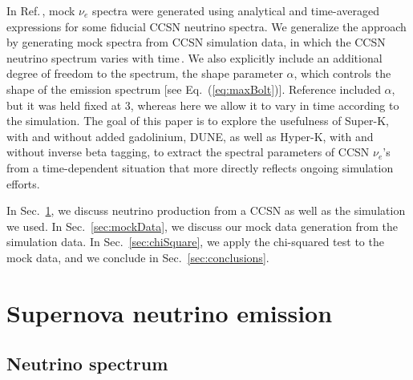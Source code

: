 \documentclass[aps,reprint,superscriptaddress]{revtex4-1}
\begin{document}
In Ref.\,\cite{Laha:2013hva}, mock $\nu_e$ spectra were generated using analytical and time-averaged expressions for some fiducial CCSN neutrino spectra.  We generalize the approach by generating mock spectra from CCSN simulation data, in which the CCSN neutrino spectrum varies with time\,\cite{Nakamura:2014caa,Nakamura:2016kkl}.  We also explicitly include an additional degree of freedom to the spectrum, the shape parameter $\alpha$, which controls the shape of the emission spectrum [see Eq.~(\ref{eq:maxBolt})].  Reference \cite{Laha:2013hva} included $\alpha$, but it was held fixed at 3, whereas here we allow it to vary in time according to the simulation. The goal of this paper is to explore the usefulness of Super-K, with and without added gadolinium, DUNE, as well as Hyper-K, with and without inverse beta tagging, to extract the spectral parameters of CCSN $\nu_{e}$'s from a time-dependent situation that more directly reflects ongoing simulation efforts. 

In Sec.~\ref{sec:emission}, we discuss neutrino production from a CCSN as well as the simulation we used. In Sec.~\ref{sec:mockData}, we discuss our mock data generation from the simulation data. In Sec.~\ref{sec:chiSquare}, we apply the chi-squared test to the mock data, and we conclude in Sec.~\ref{sec:conclusions}.

\section{Supernova neutrino emission} \label{sec:emission}

\subsection{Neutrino spectrum}
\end{document}
